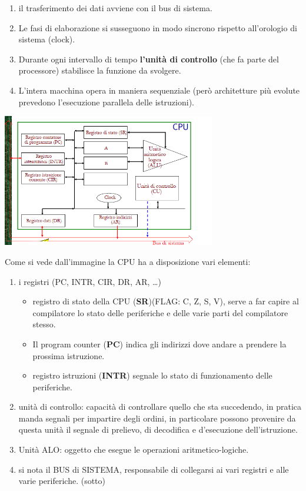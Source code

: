 \documentclass[
  paper=a4,
  oneside  ,captions=tableheading
]{scrbook}
\providecommand{\tightlist}{%
  \setlength{\itemsep}{0pt}\setlength{\parskip}{0pt}}
\begin{document}
\begin{enumerate}
\def\labelenumi{\arabic{enumi}.}
\tightlist
\item
  il trasferimento dei dati avviene con il bus di sistema.
\item
  Le fasi di elaborazione si susseguono in modo sincrono rispetto
  all'orologio di sistema (clock).
\item
  Durante ogni intervallo di tempo \textbf{l'unità di controllo} (che fa
  parte del processore) stabilisce la funzione da svolgere.
\item
  L'intera macchina opera in maniera sequenziale (però architetture più
  evolute prevedono l'esecuzione parallela delle istruzioni).
\end{enumerate}
\begin{center}
\includegraphics[height=5.8cm]{./image/image-20201111191808017.png}
\end{center}
Come si vede dall'immagine la CPU ha a disposizione vari elementi:

\begin{enumerate}
\def\labelenumi{\arabic{enumi}.}
\tightlist
\item
  i registri (PC, INTR, CIR, DR, AR, \ldots)

  \begin{itemize}
  \tightlist
  \item
    registro di stato della CPU (\textbf{SR})(FLAG: C, Z, S, V), serve a
    far capire al compilatore lo stato delle periferiche e delle varie
    parti del compilatore stesso.
  \item
    Il program counter (\textbf{PC}) indica gli indirizzi dove andare a
    prendere la prossima istruzione.
  \item
    registro istruzioni (\textbf{INTR}) segnale lo stato di
    funzionamento delle periferiche.
  \end{itemize}
\item
  unità di controllo: capacità di controllare quello che sta succedendo,
  in pratica manda segnali per impartire degli ordini, in particolare
  possono provenire da questa unità il segnale di prelievo, di
  decodifica e d'esecuzione dell'istruzione.
\item
  Unità ALO: oggetto che esegue le operazioni aritmetico-logiche.
\item
  si nota il BUS di SISTEMA, responsabile di collegarsi ai vari registri
  e alle varie periferiche. (sotto)
\end{enumerate}
\end{document}
